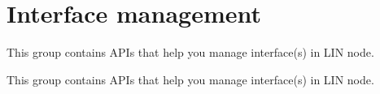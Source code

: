 \hypertarget{group__interface__management__group}{}\section{Interface management}
\label{group__interface__management__group}


This group contains A\+P\+Is that help you manage interface(s) in L\+I\+N node.  


This group contains A\+P\+Is that help you manage interface(s) in L\+I\+N node. 

